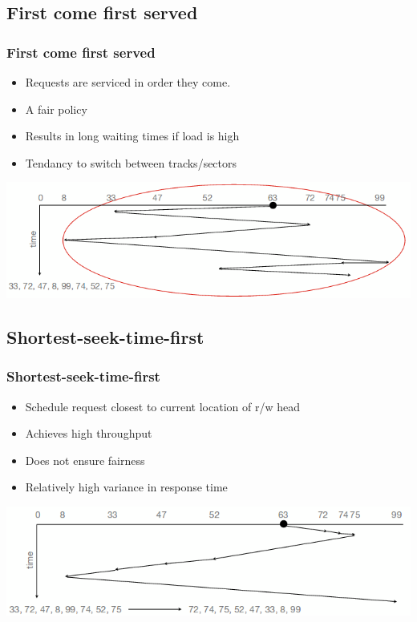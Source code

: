 \documentclass{beamer}
\begin{document}
\subsection{First come first served}
\begin{frame}
\frametitle{First come first served}
\begin{itemize}
\item Requests are serviced in order they come.
\item A fair policy
\item Results in long waiting times if load is high
\item Tendancy to switch between tracks/sectors
\end{itemize}
\includegraphics[scale=0.35]{fcfs.png}
\end{frame}
\subsection{Shortest-seek-time-first}
\begin{frame}
\frametitle{Shortest-seek-time-first}
\begin{itemize}
\item Schedule request closest to current location of r/w head
\item Achieves high throughput
\item Does not ensure fairness
\item Relatively high variance in response time
\end{itemize}
\includegraphics[scale=0.35]{sstf.png}
\end{frame}

\end{document}
